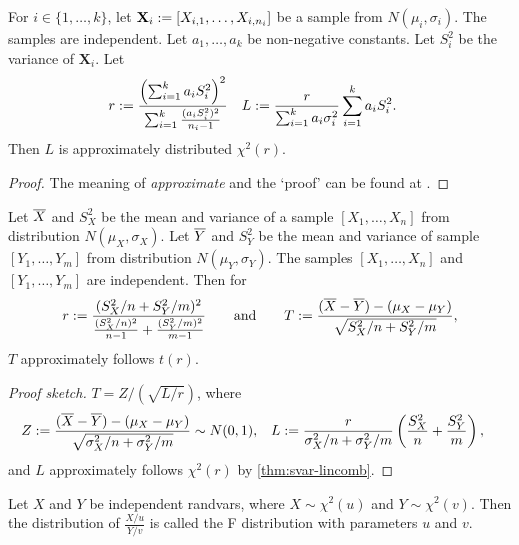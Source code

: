 \documentclass[a4paper, 12pt, fleqn]{article}
\begin{document}
\begin{lemma}
\label{thm:svar-lincomb}
For $i \in \{1, \ldots, k\}$, let $\mathbf{X}_i := [X_{i,1}, \ldots, X_{i,n_i}]$
be a sample from $N(\mu_i, \sigma_i)$. The samples are independent.
Let $a_1, \ldots, a_k$ be non-negative constants.
Let $S_i^2$ be the variance of $\mathbf{X}_i$. Let
\begin{align*}
r &:= \frac{\left(\sum_{i=1}^k a_iS_i^2\right)^2}{\sum_{i=1}^k \frac{(a_iS_i^2)^2}{n_i-1}}
& L &:= \frac{r}{\sum_{i=1}^k a_i\sigma_i^2}\sum_{i=1}^k a_iS_i^2.
\end{align*}
Then $L$ is approximately distributed $\chi^2(r)$.
\end{lemma}
\begin{proof}
The meaning of \emph{approximate} and the `proof' can be found at \cite{se.math.3189589,welch}.
\end{proof}

\begin{theorem}
Let $\overline{X}$ and $S_X^2$ be the mean and variance of a sample $[X_1, \ldots, X_n]$
from distribution $N(\mu_X, \sigma_X)$.
Let $\overline{Y}$ and $S_Y^2$ be the mean and variance of sample $[Y_1, \ldots, Y_m]$
from distribution $N(\mu_Y, \sigma_Y)$.
The samples $[X_1, \ldots, X_n]$ and $[Y_1, \ldots, Y_m]$ are independent.
Then for
\[ r := \frac{(S_X^2/n + S_Y^2/m)^2}{\frac{(S_X^2/n)^2}{n-1} + \frac{(S_Y^2/m)^2}{m-1}}
\qquad\textrm{and}\qquad T := \frac{(\overline{X}-\overline{Y}) - (\mu_X-\mu_Y)}{\sqrt{S_X^2/n + S_Y^2/m}}, \]
$T$ approximately follows $t(r)$.
\end{theorem}
\begin{proof}[Proof sketch]
$T = Z/(\sqrt{L/r})$, where
\begin{align*}
Z &:= \frac{(\overline{X}-\overline{Y}) - (\mu_X-\mu_Y)}{\sqrt{\sigma_X^2/n + \sigma_Y^2/m}} \sim N(0, 1),
& L &:= \frac{r}{\sigma_X^2/n + \sigma_Y^2/m}\left(\frac{S_X^2}{n} + \frac{S_Y^2}{m}\right),
\end{align*}
and $L$ approximately follows $\chi^2(r)$ by \cref{thm:svar-lincomb}.
\end{proof}

\begin{definition}
Let $X$ and $Y$ be independent randvars, where $X \sim \chi^2(u)$ and $Y \sim \chi^2(v)$.
Then the distribution of $\displaystyle \frac{X/u}{Y/v}$ is called the F distribution
with parameters $u$ and $v$.
\end{definition}
\end{document}
